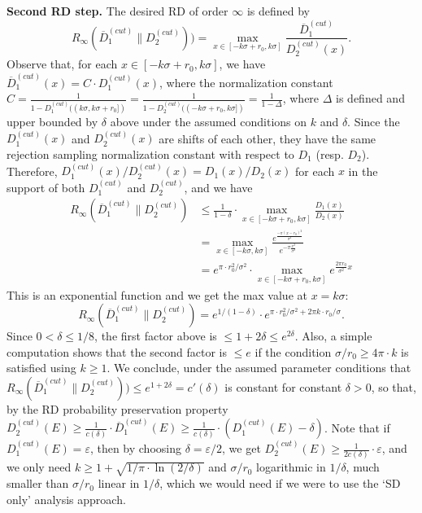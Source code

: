 \textbf{Second RD step.} The desired RD of order $\infty$ is defined by
\[
R_\infty(\overline{D}_1^{(cut)}\|D_2^{(cut)})) = \max_{x \in [-k\sigma+r_0,k\sigma]} \frac{\overline{D}_1^{(cut)}}
{D_2^{(cut)}(x)}.
\]
Observe that, for each $x \in [-k\sigma+r_0,k\sigma]$, we have $\overline{D}_1^{(cut)}(x) = C \cdot D_1^{(cut)}(x)$, where the normalization constant $C = \frac{1}{1-D_1^{(cut)}((k\sigma,k\sigma+r_0])} = \frac{1}{1-D_2^{(cut)}((-k\sigma+r_0,k\sigma])} = \frac{1}{1-\Delta}$, where $\Delta$ is defined and upper bounded by $\delta$ above under the assumed conditions on $k$ and $\delta$. Since the $D_1^{(cut)}(x)$ and $D_2^{(cut)}(x)$ are shifts of each other, they have the same rejection sampling normalization constant with respect to $D_1$ (resp. $D_2$). Therefore, $D_1^{(cut)}(x)/D_2^{(cut)}(x)=D_1(x)/D_2(x)$ for each $x$ in the support of both $D_1^{(cut)}$ and $D_2^{(cut)}$, and we have
\begin{align*}
R_\infty(\overline{D}_1^{(cut)}\|D_2^{(cut)}) &\leq \frac{1}{1-\delta} \cdot \max_{x \in [-k\sigma+r_0,k\sigma]} \frac{D_1(x)}
{D_2(x)}\\
&= \max_{x \in [-k\sigma,k\sigma]}\frac{e^{\frac{-\pi(x-r_0)^2}{\sigma^2}}}{e^{-\pi\frac{x^2}{\sigma^2}}}
\\
&= e^{\pi \cdot r_0^2/\sigma^2} \cdot \max_{x \in [-k\sigma+r_0,k\sigma]}e^{\frac{2\pi r_0}
	{\sigma^2}x}
\end{align*}
This is an exponential function and we get the max value at $x = k\sigma$:
$$
R_\infty(\overline{D}_1^{(cut)}\|D_2^{(cut)}) = e^{1/(1-\delta)} \cdot e^{\pi \cdot r_0^2/\sigma^2 + 2\pi k \cdot r_0/\sigma}.
$$
Since $0<\delta \leq 1/8$, the first factor above is $\leq 1+2\delta \leq e^{2\delta}$. Also, a simple computation shows that the second factor is $\leq e$ if the condition $\sigma/r_0 \geq 4 \pi \cdot k$ is satisfied using $k \geq 1$. We conclude, under the assumed parameter conditions that $R_\infty(\overline{D}_1^{(cut)}\|D_2^{(cut)})) \leq e^{1+2\delta} = c'(\delta)$ is constant for constant $\delta>0$, so that, by the RD probability preservation property $D_2^{(cut)}(E) \geq \frac{1}{c(\delta)} \cdot \overline{D}_1^{(cut)}(E) \geq \frac{1}{c(\delta)} \cdot (D_1^{(cut)}(E) - \delta)$. Note that if $D_1^{(cut)}(E)=\varepsilon$, then by choosing $\delta = \varepsilon/2$, we get $D_2^{(cut)}(E) \geq \frac{1}{2c(\delta)} \cdot \varepsilon$, and we only need $k \geq 1 + \sqrt{1/\pi \cdot \ln(2/\delta)}$ and $\sigma/r_0$ logarithmic in $1/\delta$,  much smaller than $\sigma/r_0$ linear in $1/\delta$, which we would need if we were to use the `SD only' analysis approach.

